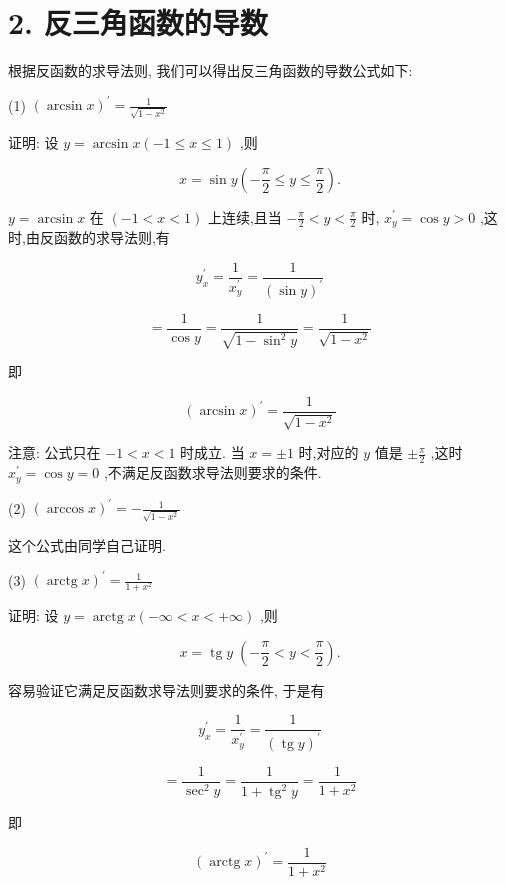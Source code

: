 \documentclass[lang=cn,newtx,10pt,scheme=chinese]{elegantbook}
\begin{document}
\section*{2. 反三角函数的导数}

根据反函数的求导法则, 我们可以得出反三角函数的导数公式如下:

(1) \({\left( \arcsin x\right) }^{\prime } = \frac{1}{\sqrt{1 - {x}^{2}}}\)

证明: 设 \(y = \arcsin x\left( {-1 \leq x \leq 1}\right)\) ,则

\[
x = \sin y\left( {-\frac{\pi }{2} \leq y \leq \frac{\pi }{2}}\right) .
\]

\(y = \arcsin x\) 在 \(\left( {-1 < x < 1}\right)\) 上连续,且当 \(- \frac{\pi }{2} < y < \frac{\pi }{2}\) 时, \({x}_{y}^{\prime } = \cos y > 0\) ,这时,由反函数的求导法则,有

\[
{y}_{x}^{\prime } = \frac{1}{{x}_{y}^{\prime }} = \frac{1}{{\left( \sin y\right) }^{\prime }}
\]

\[
= \frac{1}{\cos y} = \frac{1}{\sqrt{1 - {\sin }^{2}y}} = \frac{1}{\sqrt{1 - {x}^{2}}}
\]

即

\[
{\left( \arcsin x\right) }^{\prime } = \frac{1}{\sqrt{1 - {x}^{2}}}
\]

注意: 公式只在 \(- 1 < x < 1\) 时成立. 当 \(x = \pm 1\) 时,对应的 \(y\) 值是 \(\pm \frac{\pi }{2}\) ,这时 \({x}_{y}^{\prime } = \cos y = 0\) ,不满足反函数求导法则要求的条件.

(2) \({\left( \arccos x\right) }^{\prime } = - \frac{1}{\sqrt{1 - {x}^{2}}}\)

这个公式由同学自己证明.

(3) \({\left( \operatorname{arctg}x\right) }^{\prime } = \frac{1}{1 + {x}^{2}}\)

证明: 设 \(y = \operatorname{arctg}x\left( {-\infty < x < + \infty }\right)\) ,则

\[
x = \operatorname{tg}y\;\left( {-\frac{\pi }{2} < y < \frac{\pi }{2}}\right) .
\]

容易验证它满足反函数求导法则要求的条件, 于是有

\[
{y}_{x}^{\prime } = \frac{1}{{x}_{y}^{\prime }} = \frac{1}{{\left( \operatorname{tg}y\right) }^{\prime }}
\]

\[
= \frac{1}{{\sec }^{2}y} = \frac{1}{1 + {\operatorname{tg}}^{2}y} = \frac{1}{1 + {x}^{2}}
\]

即

\[
{\left( \operatorname{arctg}x\right) }^{\prime } = \frac{1}{1 + {x}^{2}}
\]
\end{document}
